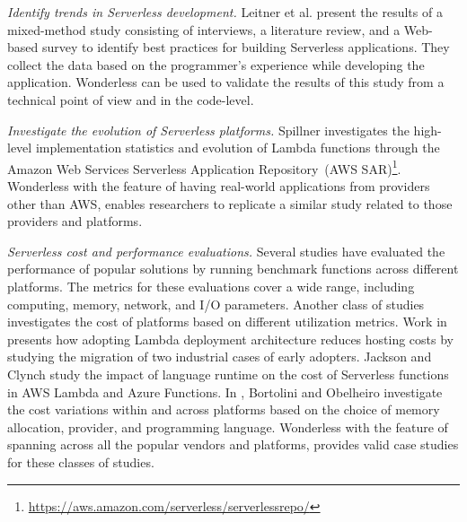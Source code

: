 \emph{Identify trends in Serverless development.}
Leitner et al.\cite{leitner2019mixed} present the results of a mixed-method 
study consisting of interviews, a literature review, and a Web-based survey 
to identify best practices for building Serverless applications. 
They collect the data based on the programmer's experience while 
developing the application. Wonderless can be used to validate the 
results of this study from a technical point of view and in the code-level.

\emph{Investigate the evolution of Serverless platforms.}
Spillner\cite{spillner2019quantitative} investigates the high-level 
implementation statistics and evolution of Lambda functions through the 
Amazon Web Services Serverless Application Repository\,
(AWS SAR)\footnote{\url{https://aws.amazon.com/serverless/serverlessrepo/}}. 
Wonderless with the feature of having real-world applications from
providers other than AWS, enables researchers to replicate a similar 
study related to those providers and platforms.

\emph{Serverless cost and performance evaluations.} 
Several studies\cite{wang2018peeking, 
	lloyd2018serverless, figiela2018performance, lee2018evaluation, 
	mcgrath2017serverless, back2018using, mohanty2018evaluation} 
have evaluated the performance of popular \faas solutions by running 
benchmark functions across different platforms. The metrics for these 
evaluations cover a wide range, including computing, memory, network, and 
I/O parameters. Another class of studies investigates the cost of \faas platforms 
based on different utilization metrics. Work in \cite{adzic2017serverless} 
presents how adopting Lambda deployment architecture reduces hosting costs 
by studying the migration of two industrial cases of early adopters.
Jackson and Clynch\cite{jackson2018investigation} study the impact of 
language runtime on the cost of Serverless functions in AWS Lambda and 
Azure Functions. In \cite{bortolini2019investigating}, Bortolini and Obelheiro 
investigate the cost variations within and across \faas platforms 
based on the choice of memory allocation, \faas provider, and 
programming language. Wonderless with the feature of spanning across 
all the popular vendors and platforms, provides valid case studies for 
these classes of studies.



